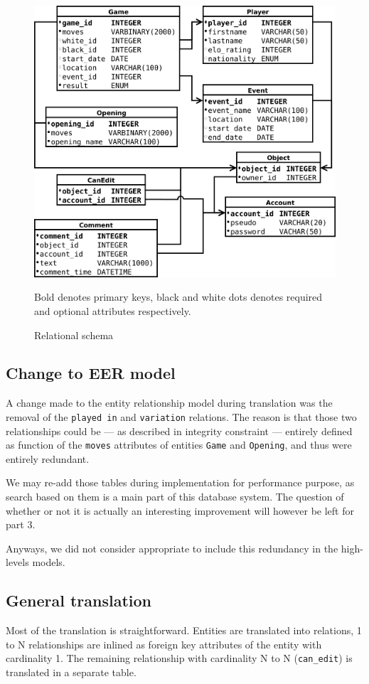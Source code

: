 \documentclass{article}
\begin{document}
\begin{figure}
\caption{Relational schema}
\label{db}
\begin{center}
\includegraphics[scale=0.4]{relational}
\end{center}
Bold denotes primary keys, black and white dots denotes required and optional attributes respectively.
\end{figure}


\subsection{Change to EER model}
A change made to the entity relationship model during translation was the removal of the \verb|played in|
and \verb|variation| relations. The reason is that those two relationships could be --- 
as described in integrity constraint --- entirely defined as function of the \verb|moves| attributes 
of entities \verb|Game| and \verb|Opening|, and thus were entirely redundant.

We may re-add those tables during implementation for performance purpose, as search based on them is
a main part of this database system. The question of whether or not it is actually an interesting
improvement will however be left for part 3.

Anyways, we did not consider appropriate to include this redundancy in the high-levels models.

\subsection{General translation}
Most of the translation is straightforward.
Entities are translated into relations, 1 to N relationships are inlined as foreign key attributes of the entity with cardinality 1.
The remaining relationship with cardinality N to N (\verb|can_edit|) is translated in a separate table.
\end{document}
